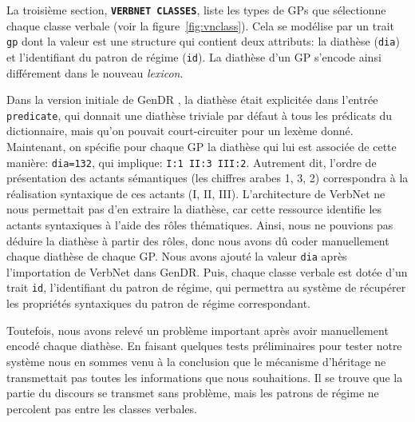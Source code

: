 La troisième section, \textbf{\texttt{VERBNET CLASSES}}, liste les types de \acp{GP} que sélectionne chaque classe verbale (voir la figure~\ref{fig:vnclass}). Cela se modélise par un trait \texttt{gp} dont la valeur est une structure qui contient deux attributs: la diathèse (\texttt{dia}) et l'identifiant du patron de régime (\texttt{id}). La diathèse d'un \ac{GP} s'encode ainsi différement dans le nouveau \emph{lexicon}. 

Dans la version initiale de GenDR \citep{lareau18}, la diathèse était explicitée dans l'entrée \texttt{predicate}, qui donnait une diathèse triviale par défaut à tous les prédicats du dictionnaire, mais qu'on pouvait court-circuiter pour un lexème donné. Maintenant, on spécifie pour chaque \ac{GP} la diathèse qui lui est associée de cette manière: \texttt{dia=132}, qui implique: \texttt{I:1 II:3 III:2}. Autrement dit, l'ordre de présentation des actants sémantiques (les chiffres arabes 1, 3, 2) correspondra à la réalisation syntaxique de ces actants (I, II, III). L'architecture de VerbNet ne nous permettait pas d'en extraire la diathèse, car cette ressource identifie les actants syntaxiques à l'aide des rôles thématiques. Ainsi, nous ne pouvions pas déduire la diathèse à partir des rôles, donc nous avons dû coder manuellement chaque diathèse de chaque \ac{GP}. Nous avons ajouté la valeur \texttt{dia} après l'importation de VerbNet dans GenDR. Puis, chaque classe verbale est dotée d'un trait \texttt{id}, l'identifiant du patron de régime, qui permettra au système de récupérer les propriétés syntaxiques du patron de régime correspondant.

Toutefois, nous avons relevé un problème important après avoir manuellement encodé chaque diathèse. En faisant quelques tests préliminaires pour tester notre système nous en sommes venu à la conclusion que le mécanisme d'héritage ne transmettait pas toutes les informations que nous souhaitions. Il se trouve que la partie du discours se transmet sans problème, mais les patrons de régime ne percolent pas entre les classes verbales. 


